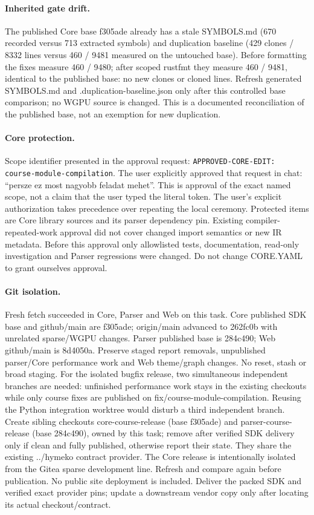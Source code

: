 \documentclass[11pt,a4paper]{article}
\begin{document}
\paragraph{Inherited gate drift.} The published Core base f305ade already has a
stale SYMBOLS.md (670 recorded versus 713 extracted symbols) and duplication
baseline (429 clones / 8332 lines versus 460 / 9481 measured on the untouched base).
Before formatting the fixes measure 460 / 9480; after scoped rustfmt they measure
460 / 9481, identical to the published base: no new clones or cloned lines.
Refresh generated SYMBOLS.md and .duplication-baseline.json only after this
controlled base comparison; no WGPU source is changed. This is a documented
reconciliation of the published base, not an exemption for new duplication.
\paragraph{Core protection.} Scope identifier presented in the approval request:
\texttt{APPROVED-CORE-EDIT: course-module-compilation}. The user explicitly approved
that request in chat: ``persze ez most nagyobb feladat mehet''. This is approval of
the exact named scope, not a claim that the user typed the literal token. The
user's explicit authorization takes precedence over repeating the local ceremony.
Protected items are Core
library sources and its parser dependency pin. Existing compiler-repeated-work
approval did not cover changed import semantics or new IR metadata. Before this
approval only allowlisted tests, documentation, read-only investigation and Parser
regressions were changed. Do not change CORE.YAML to grant ourselves approval.
\paragraph{Git isolation.} Fresh fetch succeeded in Core, Parser and Web on this
task. Core published SDK base and github/main are f305ade; origin/main advanced
to 262fc0b with unrelated sparse/WGPU changes. Parser published base is 284c490;
Web github/main is 8d4050a. Preserve staged report removals, unpublished parser/Core
performance work and Web theme/graph changes. No reset, stash or broad staging.
For the isolated bugfix release, two simultaneous independent branches are needed:
unfinished performance work stays in the existing checkouts while only course fixes
are published on fix/course-module-compilation. Reusing the Python integration
worktree would disturb a third independent branch. Create sibling checkouts
core-course-release (base f305ade) and parser-course-release (base 284c490), owned
by this task; remove after verified SDK delivery only if clean and fully published,
otherwise report their state. They share the existing ../hymeko contract provider.
The Core release is intentionally isolated from the Gitea sparse development line.
Refresh and compare again before publication. No public site
deployment is included. Deliver the packed SDK and verified exact provider pins;
update a downstream vendor copy only after locating its actual checkout/contract.
\end{document}

